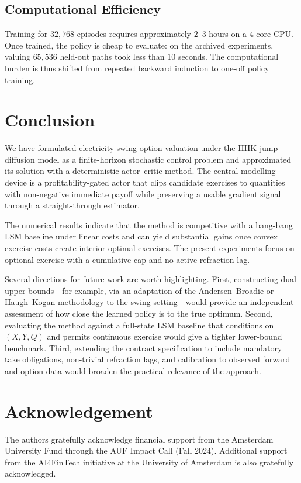 \documentclass[a4paper,fleqn]{cas-dc}
\begin{document}
\subsection{Computational Efficiency}

Training for $32{,}768$ episodes requires approximately $2$--$3$ hours on a $4$-core CPU. Once trained, the policy is cheap to evaluate: on the archived experiments, valuing $65{,}536$ held-out paths took less than $10$ seconds. The computational burden is thus shifted from repeated backward induction to one-off policy training.

\section{Conclusion}
\label{sec:conclusion}

We have formulated electricity swing-option valuation under the HHK jump-diffusion model as a finite-horizon stochastic control problem and approximated its solution with a deterministic actor--critic method. The central modelling device is a profitability-gated actor that clips candidate exercises to quantities with non-negative immediate payoff while preserving a usable gradient signal through a straight-through estimator.

The numerical results indicate that the method is competitive with a bang-bang LSM baseline under linear costs and can yield substantial gains once convex exercise costs create interior optimal exercises. The present experiments focus on optional exercise with a cumulative cap and no active refraction lag.

Several directions for future work are worth highlighting. First, constructing dual upper bounds---for example, via an adaptation of the Andersen--Broadie or Haugh--Kogan methodology to the swing setting---would provide an independent assessment of how close the learned policy is to the true optimum. Second, evaluating the method against a full-state LSM baseline that conditions on $(X,Y,Q)$ and permits continuous exercise would give a tighter lower-bound benchmark. Third, extending the contract specification to include mandatory take obligations, non-trivial refraction lags, and calibration to observed forward and option data would broaden the practical relevance of the approach.

\section*{Acknowledgement}

The authors gratefully acknowledge financial support from the Amsterdam University Fund through the AUF Impact Call (Fall 2024). Additional support from the AI4FinTech initiative at the University of Amsterdam is also gratefully acknowledged.



\end{document}
